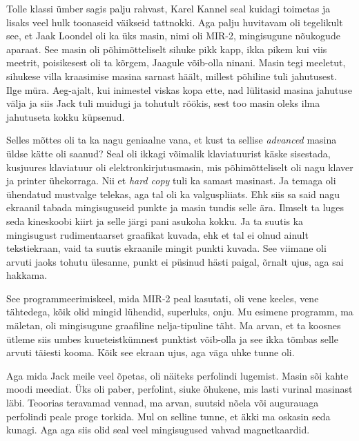 Tolle klassi ümber sagis palju rahvast, Karel Kannel seal kuidagi toimetas ja lisaks veel hulk toonaseid väikseid tattnokki. Aga palju huvitavam oli tegelikult see, et Jaak Loondel oli ka üks masin, nimi oli MIR-2, mingisugune nõukogude aparaat. See masin oli põhimõtteliselt sihuke pikk kapp, ikka pikem kui viis meetrit, poisikesest oli ta kõrgem, Jaagule võib-olla ninani. Masin tegi meeletut, sihukese villa kraasimise masina sarnast häält, millest põhiline tuli jahutusest. Ilge müra. Aeg-ajalt, kui inimestel viskas  kopa ette,  nad lülitasid masina jahutuse välja ja siis Jack tuli muidugi ja tohutult röökis, sest too masin oleks ilma jahutuseta kokku küpsenud. 

Selles mõttes oli ta ka nagu geniaalne vana, et kust ta sellise \emph{advanced} masina üldse kätte oli saanud? Seal oli ikkagi võimalik klaviatuurist käske sisestada, kusjuures klaviatuur oli elektronkirjutusmasin, mis  põhimõtteliselt oli nagu klaver ja printer ühekorraga. Nii et \emph{hard copy} tuli ka samast masinast. Ja temaga oli ühendatud mustvalge telekas, aga tal oli ka valguspliiats. Ehk siis sa said nagu ekraanil tabada mingisuguseid punkte ja  masin tundis selle ära. Ilmselt ta luges seda  kineskoobi kiirt ja selle järgi pani asukoha kokku. Ja ta suutis ka mingisugust rudimentaarset graafikat kuvada, ehk et tal ei olnud ainult tekstiekraan, vaid ta suutis ekraanile  mingit punkti kuvada. See viimane oli arvuti jaoks tohutu ülesanne, punkt ei püsinud hästi paigal, õrnalt ujus, aga sai hakkama. 

See programmeerimiskeel, mida MIR-2 peal kasutati, oli vene keeles, vene tähtedega, kõik olid mingid lühendid, superluks, onju. Mu esimene programm, ma mäletan, oli mingisugune graafiline nelja-tipuline täht. Ma arvan, et ta koosnes ütleme siis  umbes kuueteistkümnest punktist võib-olla ja see ikka tõmbas selle arvuti täiesti kooma. Kõik see ekraan ujus, aga väga uhke tunne oli. 

Aga mida Jack meile veel õpetas, oli näiteks perfolindi lugemist. Masin sõi kahte moodi meediat. Üks oli paber, perfolint, siuke õhukene, mis lasti vurinal masinast läbi. Teoorias teravamad vennad, ma arvan, suutsid nõela või augurauaga  perfolindi peale proge torkida. Mul on selline tunne, et äkki ma oskasin seda kunagi. Aga aga siis olid seal veel mingisugused vahvad magnetkaardid. 

